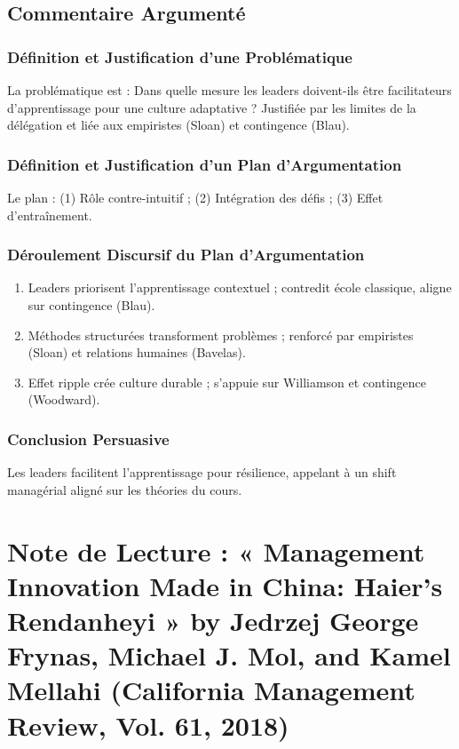 \documentclass[11pt]{rapportECL}
\begin{document}
\subsection{Commentaire Argumenté}

\subsubsection{Définition et Justification d’une Problématique}
La problématique est : Dans quelle mesure les leaders doivent-ils être facilitateurs d’apprentissage pour une culture adaptative ? Justifiée par les limites de la délégation et liée aux empiristes (Sloan) et contingence (Blau).

\subsubsection{Définition et Justification d’un Plan d’Argumentation}
Le plan : (1) Rôle contre-intuitif ; (2) Intégration des défis ; (3) Effet d’entraînement.

\subsubsection{Déroulement Discursif du Plan d’Argumentation}
\begin{enumerate}
\item Leaders priorisent l’apprentissage contextuel ; contredit école classique, aligne sur contingence (Blau).
\item Méthodes structurées transforment problèmes ; renforcé par empiristes (Sloan) et relations humaines (Bavelas).
\item Effet ripple crée culture durable ; s’appuie sur Williamson et contingence (Woodward).
\end{enumerate}

\subsubsection{Conclusion Persuasive}
Les leaders facilitent l’apprentissage pour résilience, appelant à un shift managérial aligné sur les théories du cours.

\section{Note de Lecture : « Management Innovation Made in China: Haier’s Rendanheyi » by Jedrzej George Frynas, Michael J. Mol, and Kamel Mellahi (California Management Review, Vol. 61, 2018)}
\end{document}

